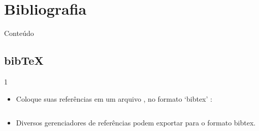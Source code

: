 \documentclass{beamer}
\begin{document}
\section{Bibliografia}

\begin{frame}{Conteúdo}
\begin{multicols}{2}
	\tableofcontents[currentsection]
\end{multicols}
\end{frame}

\subsection{bib\TeX}
\begin{frame}[fragile]{\insertsubsection{} 1}
	\begin{itemize}
		\item Coloque suas referências em um arquivo , no formato `bibtex' :
		\inputminted[fontsize=\scriptsize,frame=single]{latex}{bib-example.bib}
		\item Diversos gerenciadores de referências podem exportar para o formato bibtex.
	\end{itemize}
\end{frame}
\end{document}
